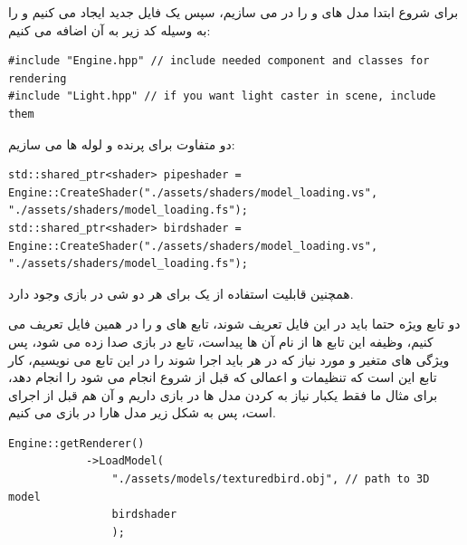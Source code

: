 \documentclass[a4paper, 12pt]{report}
\newcommand{\lrit}[1]{\lr{\textit{#1}}}
\begin{document}
    برای شروع ابتدا مدل های  و   را در  می سازیم، سپس یک فایل جدید ایجاد می کنیم و  را به وسیله کد زیر به آن اضافه می کنیم:

        \begin{LTR}
    \small
        \begin{lstlisting}[style=C++Style,caption=\lrit{adding Engine to project}]
#include "Engine.hpp" // include needed component and classes for rendering
#include "Light.hpp" // if you want light caster in scene, include them
        \end{lstlisting}
    \end{LTR}
    \normalsize
    \vspace*{0.3cm}

    دو  متفاوت برای پرنده و لوله ها می سازیم:
\begin{LTR}
    \small
        \begin{lstlisting}[style=C++Style,caption=\lrit{creating shaders}]
std::shared_ptr<shader> pipeshader = Engine::CreateShader("./assets/shaders/model_loading.vs", "./assets/shaders/model_loading.fs");
std::shared_ptr<shader> birdshader = Engine::CreateShader("./assets/shaders/model_loading.vs", "./assets/shaders/model_loading.fs");
        \end{lstlisting}
    \end{LTR}
    \normalsize
    \vspace*{0.3cm}
    همچنین قابلیت استفاده از یک  برای هر دو شی در بازی وجود دارد.\par
    دو تابع ویژه حتما باید در این فایل تعریف شوند، تابع های  و  را در همین فایل تعریف می کنیم، وظیفه این تابع ها از نام آن ها پیداست، تابع  در  بازی صدا زده می شود، پس ویژگی های متغیر و مورد نیاز که در هر  باید اجرا شوند را در این تابع می نویسیم، کار تابع  این است که تنظیمات و اعمالی که قبل از شروع  انجام می شود را انجام دهد، برای مثال ما فقط یکبار نیاز به  کردن مدل ها در بازی داریم و آن هم قبل از اجرای  است، پس به شکل زیر مدل هارا در بازی  می کنیم.

\begin{LTR}
    \small
        \begin{lstlisting}[style=C++Style,caption=\lrit{loading a 3D model}]
Engine::getRenderer()
            ->LoadModel(
                "./assets/models/texturedbird.obj", // path to 3D model
                birdshader
                );
        \end{lstlisting}
    \end{LTR}
    \normalsize
    \vspace*{0.3cm}
\end{document}
